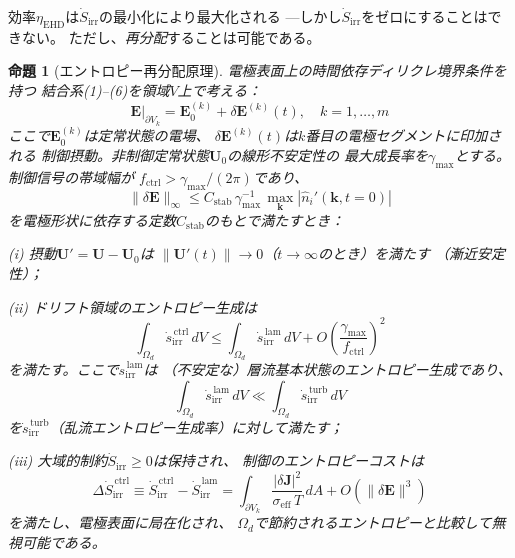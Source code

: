 \documentclass[12pt,twocolumn]{ltjsarticle}
\newtheorem{theorem}{命題}
\newcommand{\ee}{\mathbf{E}}
\newcommand{\jj}{\mathbf{J}}
\newcommand{\uu}{\mathbf{U}}
\newcommand{\Sdot}{\dot{S}_{\mathrm{irr}}}
\newcommand{\sdot}{\dot{s}_{\mathrm{irr}}}
\begin{document}
効率$\eta_{\mathrm{EHD}}$は$\Sdot$の最小化により最大化される
---しかし$\Sdot$をゼロにすることはできない。
ただし、\emph{再分配}することは可能である。

\begin{theorem}[エントロピー再分配原理]
\label{thm:entropy_redistribution}
電極表面上の時間依存ディリクレ境界条件を持つ
結合系\textnormal{(1)--(6)}を領域$V$上で考える：
\begin{equation}
  \ee\big|_{\partial V_k}
  = \ee_0^{(k)} + \delta\ee^{(k)}(t), \quad k = 1,\ldots,m
  \label{eq:BC}
\end{equation}
ここで$\ee_0^{(k)}$は定常状態の電場、
$\delta\ee^{(k)}(t)$は$k$番目の電極セグメントに印加される
制御摂動。非制御定常状態$\uu_0$の線形不安定性の
最大成長率を$\gamma_{\max}$とする。
制御信号の帯域幅が
$f_{\mathrm{ctrl}} > \gamma_{\max}/(2\pi)$であり、
\begin{equation}
  \|\delta\ee\|_{\infty}
  \leq C_{\mathrm{stab}}\,\gamma_{\max}^{-1}\,
  \max_{\mathbf{k}} |\hat{n}_i'(\mathbf{k}, t=0)|
  \label{eq:control_bound}
\end{equation}
を電極形状に依存する定数$C_{\mathrm{stab}}$のもとで満たすとき：

\noindent\textnormal{(i)} 摂動$\uu' = \uu - \uu_0$は
$\|\uu'(t)\| \to 0$（$t \to \infty$のとき）を満たす
（漸近安定性）；

\noindent\textnormal{(ii)} ドリフト領域のエントロピー生成は
\begin{equation}
  \int_{\Omega_d} \sdot^{\,\mathrm{ctrl}} \, dV
  \leq \int_{\Omega_d} \sdot^{\,\mathrm{lam}} \, dV
  + O\!\left(\frac{\gamma_{\max}}{f_{\mathrm{ctrl}}}\right)^2
  \label{eq:entropy_drift_bound}
\end{equation}
を満たす。ここで$\sdot^{\,\mathrm{lam}}$は
（不安定な）層流基本状態のエントロピー生成であり、
\begin{equation}
  \int_{\Omega_d} \sdot^{\,\mathrm{lam}} \, dV
  \ll \int_{\Omega_d} \sdot^{\,\mathrm{turb}} \, dV
  \label{eq:lam_vs_turb}
\end{equation}
を$\sdot^{\,\mathrm{turb}}$（乱流エントロピー生成率）に対して満たす；

\noindent\textnormal{(iii)} 大域的制約$\Sdot \geq 0$は保持され、
制御のエントロピーコストは
\begin{equation}
  \Delta\Sdot^{\,\mathrm{ctrl}}
  \equiv \Sdot^{\,\mathrm{ctrl}} - \Sdot^{\,\mathrm{lam}}
  = \int_{\partial V_k} \frac{|\delta\jj|^2}{\sigma_{\mathrm{eff}}\,T}
    \, dA + O(\|\delta\ee\|^3)
  \label{eq:entropy_cost}
\end{equation}
を満たし、電極表面に局在化され、
$\Omega_d$で\emph{節約}されるエントロピーと比較して無視可能である。
\end{theorem}
\end{document}
